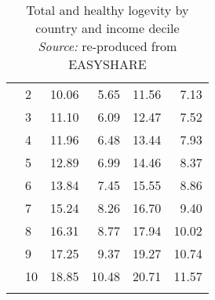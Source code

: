 \begin{table}
\begin{tabular}{llrrrr}
& 2  &   10.06 &   5.65 &  11.56 &   7.13 \\
 & 3  &   11.10 &   6.09 &  12.47 &   7.52 \\
 & 4  &   11.96 &   6.48 &  13.44 &   7.93 \\
& 5  &   12.89 &   6.99 &  14.46 &   8.37 \\
 & 6  &   13.84 &   7.45 &  15.55 &   8.86 \\
 & 7  &   15.24 &   8.26 &  16.70 &   9.40 \\
            & 8  &   16.31 &   8.77 &  17.94 &  10.02 \\
            & 9  &   17.25 &   9.37 &  19.27 &  10.74 \\
            & 10 &   18.85 &  10.48 &  20.71 &  11.57 \\
              & &    &   &   &  \\
\bottomrule
\end{tabular}
\captionsetup{justification=centering}
\caption{Total and healthy logevity by country and income decile \\ 
\textit{Source:} re-produced from EASYSHARE }
\end{table}





